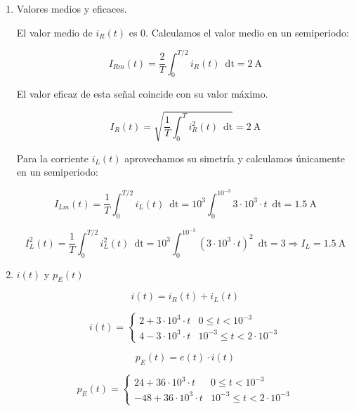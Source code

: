 \documentclass[10pt]{article}
\begin{document}
\begin{enumerate}
  
\item Valores medios y eficaces.

  El valor medio de $i_R(t)$ es 0. Calculamos el valor medio en un semiperiodo:

  \[
    I_{Rm}(t) = \frac{2}{T} \int_0^{T/2} i_R(t) \enspace \mathrm{dt} = \SI{2}{\ampere} 
  \]

  El valor eficaz de esta señal coincide con su valor máximo.

  \[
    I_R(t) = \sqrt{\frac{1}{T} \int_0^T i^2_R(t) \enspace \mathrm{dt}} = \SI{2}{\ampere} 
  \]

  Para la corriente $i_L(t)$ aprovechamos su simetría y calculamos únicamente en un semiperiodo:

    \[
      I_{Lm}(t) = \frac{1}{T} \int_0^{T/2} i_L(t) \enspace \mathrm{dt} = 10^3 \int_0^{10^{-3}} 3 \cdot 10 ^3 \cdot t \enspace \mathrm{dt} = \SI{1.5}{\ampere} 
  \]

      \[
      I^2_L(t) = \frac{1}{T} \int_0^{T/2} i^2_L(t) \enspace \mathrm{dt} = 10^3 \int_0^{10^{-3}} (3 \cdot 10 ^3 \cdot t)^2 \enspace \mathrm{dt} = 3 \Rightarrow I_L = \SI{1.5}{\ampere} 
  \]

  
\item $i(t)$ y $p_E(t)$

  \[
    i(t) = i_R(t) + i_L(t)
  \]

  \[
    i(t) = %
    \begin{cases}
      2 + 3\cdot 10^3 \cdot t &  0 \leq t < 10^{-3}\\ 
      4 - 3\cdot 10^3 \cdot t & 10^{-3} \leq t < 2 \cdot 10^{-3}
    \end{cases}
  \]

  \[
    p_E(t) = e(t) \cdot i(t)
  \]
  
  \[
    p_E(t) = %
    \begin{cases}
      24 + 36\cdot 10^3 \cdot t &  0 \leq t < 10^{-3}\\ 
      -48 + 36\cdot 10^3 \cdot t & 10^{-3} \leq t < 2 \cdot 10^{-3}
    \end{cases}
  \]

\end{enumerate}
\end{document}
